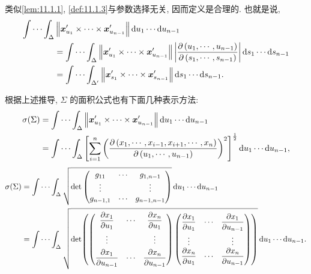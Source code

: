 \begin{definition}
类似\cref{lem:11.1.1}, \cref{def:11.1.3}与参数选择无关, 因而定义是合理的. 也就是说,
\begin{align*}
  \idotsint_{\Delta} & \left\|\boldsymbol{x}_{u_{1}}^{\prime} \times \cdots \times \boldsymbol{x}_{u_{n-1}}^{\prime}\right\| \mathrm{d} u_{1} \cdots \mathrm{d} u_{n-1} \\
  & =\idotsint_{\Delta}\left\|\boldsymbol{x}_{u_{1}}^{\prime} \times \cdots \times \boldsymbol{x}_{u_{n-1}}^{\prime}\right\|\left|\frac{\partial\left(u_{1}, \cdots, u_{n-1}\right)}{\partial\left(s_{1}, \cdots, s_{n-1}\right)}\right| \mathrm{d} s_{1} \cdots \mathrm{d} s_{n-1} \\
  & =\idotsint_{\Delta^{\prime}}\left\|\boldsymbol{x}_{s_{1}}^{\prime} \times \cdots \times \boldsymbol{x}_{s_{n-1}}^{\prime}\right\| \mathrm{d} s_{1} \cdots \mathrm{d} s_{n-1}.
\end{align*}

根据上述推导, $\Sigma$ 的面积公式也有下面几种表示方法:
\begin{align*}
  \sigma(\Sigma) &=\idotsint_{\Delta}\left\|\boldsymbol{x}_{u_{1}}^{\prime} \times \cdots \times \boldsymbol{x}_{u_{n-1}}^{\prime}\right\| \mathrm{d} u_{1} \cdots \mathrm{d} u_{n-1} \\
  &=\idotsint_{\Delta}\left[\sum_{i=1}^{n}\left(\frac{\partial\left(x_{1}, \cdots, x_{i-1}, x_{i+1}, \cdots, x_{n}\right)}{\partial\left(u_{1}, \cdots, u_{n-1}\right)}\right)^{2}\right]^{\frac{1}{2}} \mathrm{d} u_{1} \cdots \mathrm{d} u_{n-1},
\end{align*}
\begin{align*}
  \sigma(\Sigma) &=\idotsint_{\Delta} \sqrt{\operatorname{det}\begin{pmatrix}
      g_{11} & \cdots & g_{1, n-1} \\
      \vdots & & \vdots \\
      g_{n-1,1} & \cdots & g_{n-1, n-1}
    \end{pmatrix}}\,\mathrm{d} u_{1} \cdots \mathrm{d} u_{n-1} \\
  &=\idotsint_{\Delta} \sqrt{\operatorname{det}\!\left(\begin{pmatrix}
      \dfrac{\partial x_{1}}{\partial u_{1}} & \cdots & \dfrac{\partial x_{n}}{\partial u_{1}} \\[8pt]
      \vdots & & \vdots \\[4pt]
      \dfrac{\partial x_{1}}{\partial u_{n-1}} & \cdots & \dfrac{\partial x_{n}}{\partial u_{n-1}}
    \end{pmatrix}
    \begin{pmatrix}
      \dfrac{\partial x_{1}}{\partial u_{1}} & \cdots & \dfrac{\partial x_{1}}{\partial u_{n-1}} \\[8pt]
      \vdots & & \vdots \\
      \dfrac{\partial x_{n}}{\partial u_{1}} & \cdots & \dfrac{\partial x_{n}}{\partial u_{n-1}}
    \end{pmatrix}\right)}\,\mathrm{d} u_{1} \cdots \mathrm{d} u_{n-1}.
\end{align*}
\end{definition}

